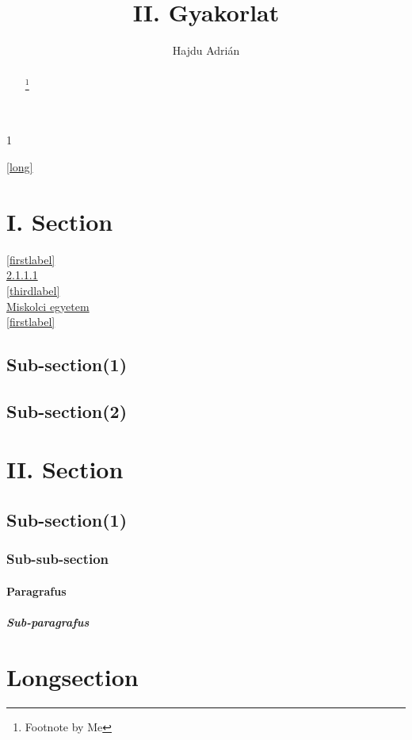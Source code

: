 \documentclass[12pt,twoside]{article}
\author{Hajdu Adrián}
\title{II. Gyakorlat}
\begin{document}
\setcounter{tocdepth}{5}1
\setcounter{secnumdepth}{5}
\maketitle
\textcolor{blue}{\ref{long}\pageref{long}}\\
\begin{abstract}
\lipsum[1-2]
\footnote{Footnote by Me}
\end{abstract}
\newpage
\tableofcontents

\newpage
\section{I. Section}
\textcolor{red}{\ref{firstlabel}\pageref{firstlabel}}\\
\textcolor{green}{\ref{secondlabel}\pageref{secondlabel}}\\
\textcolor{blue}{\ref{thirdlabel}\pageref{thirdlabel}}\\
\textcolor{orange}{\href{https://uni-miskolc.hu}{Miskolci egyetem}}\\
\textcolor{purple}{\autoref{firstlabel}}
\subsection{Sub-section(1)}
\lipsum[1-3]
\label{firstlabel}
\lipsum[4]
\subsection{Sub-section(2)}
\lipsum[1-6]
\newpage
\section[second]{II. Section}
\subsection{Sub-section(1)}
\subsubsection{Sub-sub-section}
\paragraph{Paragrafus}
\label{secondlabel}
\subparagraph{Sub-paragrafus}
\newpage
\section*{Longsection}
\lipsum[1]
\label{long}
\lipsum[2-9]
\end{document}
